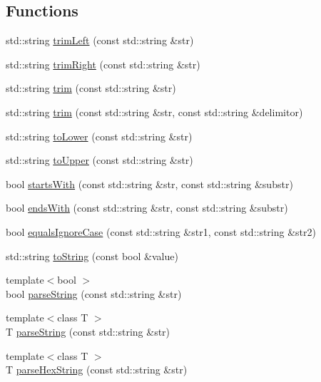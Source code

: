 \subsection*{Functions}
\begin{DoxyCompactItemize}
\item 
std\+::string \hyperlink{namespacestrutil_ab231c71e590e3a864bcc33b9533a3282}{trim\+Left} (const std\+::string \&str)
\item 
std\+::string \hyperlink{namespacestrutil_af7e41abccf3798fcfc8146dacd6a0e6e}{trim\+Right} (const std\+::string \&str)
\item 
std\+::string \hyperlink{namespacestrutil_ae97dd8d01282a53dff197b2640aaf6a2}{trim} (const std\+::string \&str)
\item 
std\+::string \hyperlink{namespacestrutil_a30dcaa35899109b36dede8d7b65bacb4}{trim} (const std\+::string \&str, const std\+::string \&delimitor)
\item 
std\+::string \hyperlink{namespacestrutil_a33217c775cf7388f4c4e1af1e1fb45a8}{to\+Lower} (const std\+::string \&str)
\item 
std\+::string \hyperlink{namespacestrutil_aa77b45238488b49ad55d2b73294c88ae}{to\+Upper} (const std\+::string \&str)
\item 
bool \hyperlink{namespacestrutil_a5526a6beb76b21d3961809b8ff9d629d}{starts\+With} (const std\+::string \&str, const std\+::string \&substr)
\item 
bool \hyperlink{namespacestrutil_af34e7273311c772c2c0d7b804aa5fb49}{ends\+With} (const std\+::string \&str, const std\+::string \&substr)
\item 
bool \hyperlink{namespacestrutil_a4038560d84d6462679bcd4aaf7499d0e}{equals\+Ignore\+Case} (const std\+::string \&str1, const std\+::string \&str2)
\item 
std\+::string \hyperlink{namespacestrutil_a60b48671666d33f31761ca4fc121c1c4}{to\+String} (const bool \&value)
\item 
{\footnotesize template$<$bool $>$ }\\bool \hyperlink{namespacestrutil_a0776455dafd1a05a3dafc302001d8520}{parse\+String} (const std\+::string \&str)
\item 
{\footnotesize template$<$class T $>$ }\\T \hyperlink{namespacestrutil_ad4e6e4f5f146b8e4c08638557a3d0c3f}{parse\+String} (const std\+::string \&str)
\item 
{\footnotesize template$<$class T $>$ }\\T \hyperlink{namespacestrutil_a28042779b9abcbc8d7b34885b03182d4}{parse\+Hex\+String} (const std\+::string \&str)

\end{DoxyCompactItemize}

